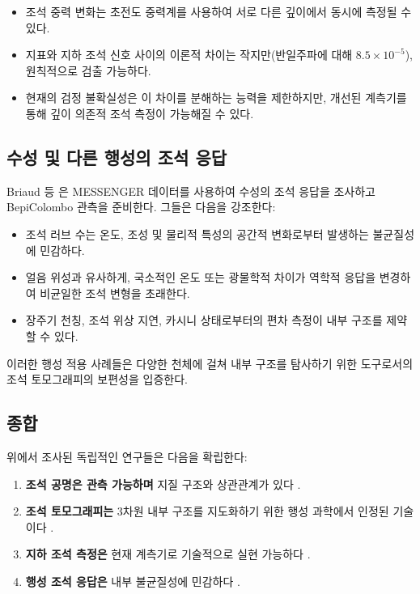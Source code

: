 \documentclass[12pt,a4paper]{article}
\theoremstyle{remark}
\begin{document}
	\begin{itemize}
		\item 조석 중력 변화는 초전도 중력계를 사용하여 서로 다른 깊이에서 동시에 측정될 수 있다.
		\item 지표와 지하 조석 신호 사이의 이론적 차이는 작지만(반일주파에 대해 \(8.5 \times 10^{-5}\)), 원칙적으로 검출 가능하다.
		\item 현재의 검정 불확실성은 이 차이를 분해하는 능력을 제한하지만, 개선된 계측기를 통해 깊이 의존적 조석 측정이 가능해질 수 있다.
	\end{itemize}
	
	\subsection{수성 및 다른 행성의 조석 응답}
	
	Briaud 등 \cite{Briaud2025}은 MESSENGER 데이터를 사용하여 수성의 조석 응답을 조사하고 BepiColombo 관측을 준비한다. 그들은 다음을 강조한다:
	
	\begin{itemize}
		\item 조석 러브 수는 온도, 조성 및 물리적 특성의 공간적 변화로부터 발생하는 불균질성에 민감하다.
		\item 얼음 위성과 유사하게, 국소적인 온도 또는 광물학적 차이가 역학적 응답을 변경하여 비균일한 조석 변형을 초래한다.
		\item 장주기 천칭, 조석 위상 지연, 카시니 상태로부터의 편차 측정이 내부 구조를 제약할 수 있다.
	\end{itemize}
	
	이러한 행성 적용 사례들은 다양한 천체에 걸쳐 내부 구조를 탐사하기 위한 도구로서의 조석 토모그래피의 보편성을 입증한다.
	
	\subsection{종합}
	
	위에서 조사된 독립적인 연구들은 다음을 확립한다:
	
	\begin{enumerate}
		\item \textbf{조석 공명은 관측 가능하며} 지질 구조와 상관관계가 있다 \cite{Sibgatulin2014}.
		\item \textbf{조석 토모그래피는} 3차원 내부 구조를 지도화하기 위한 행성 과학에서 인정된 기술이다 \cite{RoviraNavarro2025}.
		\item \textbf{지하 조석 측정은} 현재 계측기로 기술적으로 실현 가능하다 \cite{Rogister2024}.
		\item \textbf{행성 조석 응답은} 내부 불균질성에 민감하다 \cite{Briaud2025}.
	\end{enumerate}
	
\end{document}
